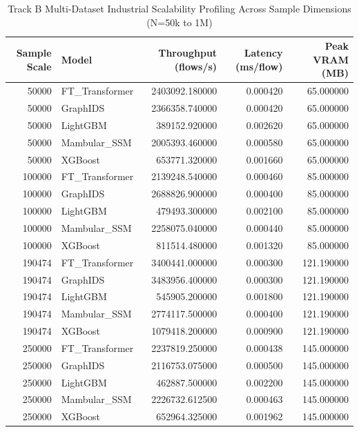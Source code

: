 \begin{table}[t]
\centering
\caption{Track B Multi-Dataset Industrial Scalability Profiling Across Sample Dimensions (N=50k to 1M)}
\label{tab:scalability_summary}
\small
\begin{tabular}{rlrrr}
\toprule
Sample Scale & Model & Throughput (flows/s) & Latency (ms/flow) & Peak VRAM (MB) \\
\midrule
50000 & FT_Transformer & 2403092.180000 & 0.000420 & 65.000000 \\
50000 & GraphIDS & 2366358.740000 & 0.000420 & 65.000000 \\
50000 & LightGBM & 389152.920000 & 0.002620 & 65.000000 \\
50000 & Mambular_SSM & 2005393.460000 & 0.000580 & 65.000000 \\
50000 & XGBoost & 653771.320000 & 0.001660 & 65.000000 \\
100000 & FT_Transformer & 2139248.540000 & 0.000460 & 85.000000 \\
100000 & GraphIDS & 2688826.900000 & 0.000400 & 85.000000 \\
100000 & LightGBM & 479493.300000 & 0.002100 & 85.000000 \\
100000 & Mambular_SSM & 2258075.040000 & 0.000440 & 85.000000 \\
100000 & XGBoost & 811514.480000 & 0.001320 & 85.000000 \\
190474 & FT_Transformer & 3400441.000000 & 0.000300 & 121.190000 \\
190474 & GraphIDS & 3483956.400000 & 0.000300 & 121.190000 \\
190474 & LightGBM & 545905.200000 & 0.001800 & 121.190000 \\
190474 & Mambular_SSM & 2774117.500000 & 0.000400 & 121.190000 \\
190474 & XGBoost & 1079418.200000 & 0.000900 & 121.190000 \\
250000 & FT_Transformer & 2237819.250000 & 0.000438 & 145.000000 \\
250000 & GraphIDS & 2116753.075000 & 0.000500 & 145.000000 \\
250000 & LightGBM & 462887.500000 & 0.002200 & 145.000000 \\
250000 & Mambular_SSM & 2226732.612500 & 0.000463 & 145.000000 \\
250000 & XGBoost & 652964.325000 & 0.001962 & 145.000000 \\
\bottomrule
\end{tabular}

\end{table}
